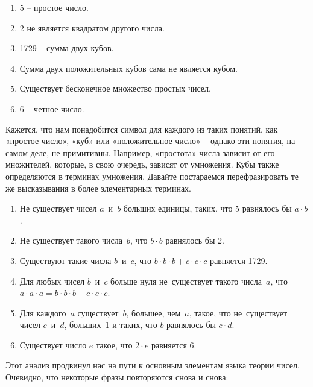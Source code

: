 \documentclass[../main.tex]{subfiles}
\begin{document}
\begin{enumerate}[label=(\arabic*), topsep=6pt, noitemsep, left=\parindent]
    \item 5 \--- простое число.
    \item 2 не является квадратом другого числа.
    \item 1729 \--- сумма двух кубов.
    \item Сумма двух положительных кубов сама не является кубом.
    \item Существует бесконечное множество простых чисел.
    \item 6 \--- четное число.
\end{enumerate}

Кажется, что нам понадобится символ для каждого из таких понятий, как «простое число», «куб» или «положительное число» \--- однако эти понятия, на самом деле, не примитивны. Например, «простота» числа зависит от его множителей, которые, в свою очередь, зависят от умножения. Кубы также определяются в терминах умножения. Давайте постараемся перефразировать те же высказывания в более элементарных терминах.

\begin{enumerate}[label=(\arabic*'), topsep=6pt, noitemsep, left=\parindent]
    \item Не существует чисел $a$~и~$b$ больших единицы, таких, что 5 равнялось бы $a \cdot b$.

    \item Не существует такого числа~$b$, что $b \cdot b$ равнялось бы 2.

    \item Существуют такие числа $b$~и~$c$, что $b \cdot b \cdot b + c \cdot c \cdot c$ равняется 1729.

    \item Для любых чисел $b$~и~$c$ больше нуля не~существует такого числа~$a$, что $a \cdot a \cdot a = b \cdot b \cdot b + c \cdot c \cdot c$.

    \item Для каждого~$a$ существует~$b$, большее, чем~$a$, такое, что не~существует чисел $c$~и~$d$, больших~1 и таких, что $b$ равнялось бы $c \cdot d$.

    \item Существует число $e$ такое, что $2 \cdot e$ равняется 6.
\end{enumerate}

Этот анализ продвинул нас на пути к основным элементам языка теории чисел. Очевидно, что некоторые фразы повторяются снова и снова:
\end{document}
